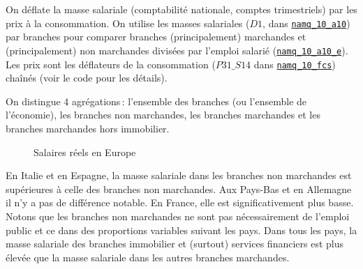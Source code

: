 \documentclass[
  french,
  9pt,
  a4paper,
]{article}
\begin{document}
On déflate la masse salariale (comptabilité nationale, comptes
trimestriels) par les prix à la consommation. On utilise les masses
salariales (\(D1\), dans
\href{https://ec.europa.eu/eurostat/databrowser/view/NAMQ_10_A10/default/table?lang=en}{\texttt{namq\_10\_a10}})
par branches pour comparer branches (principalement) marchandes et
(principalement) non marchandes divisées par l'emploi salarié
(\href{https://ec.europa.eu/eurostat/databrowser/view/NAMQ_10_A10_E__custom_7475124/default/table?lang=en}{\texttt{namq\_10\_a10\_e}}).
Les prix sont les déflateurs de la consommation (\(P31\_S14\) dans
\href{https://ec.europa.eu/eurostat/databrowser/product/page/NAMQ_10_FCS}{\texttt{namq\_10\_fcs}})
chaînés (voir le code pour les détails).

On distingue 4 agrégations\,: l'ensemble des branches (ou l'ensemble de
l'économie), les branches non marchandes, les branches marchandes et les
branches marchandes hors immobilier.

\begin{figure}[H]

\caption{\label{fig-salaires}Salaires réels en Europe}


\end{figure}%

En Italie et en Espagne, la masse salariale dans les branches non
marchandes est supérieures à celle des branches non marchandes. Aux
Pays-Bas et en Allemagne il n'y a pas de différence notable. En France,
elle est significativement plus basse. Notons que les branches non
marchandes ne sont pas nécessairement de l'emploi public et ce dans des
proportions variables suivant les pays. Dans tous les pays, la masse
salariale des branches immobilier et (surtout) services financiers est
plus élevée que la masse salariale dans les autres branches marchandes.
\end{document}
